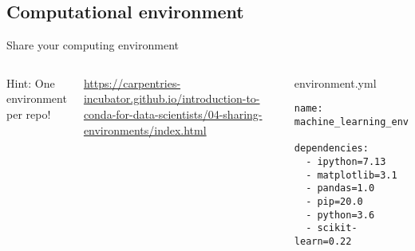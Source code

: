 \documentclass[10pt,aspectratio=169]{beamer} %
\begin{document}
\subsection{Computational environment}
\begin{frame}[fragile,label=frame29]{Share your computing environment}
\begin{columns}
Hint: One environment per repo!	\\
\vspace{5mm}

\url{https://carpentries-incubator.github.io/introduction-to-conda-for-data-scientists/04-sharing-environments/index.html}
\begin{block}{environment.yml}
\begin{verbatim}
name: machine_learning_env

dependencies:
  - ipython=7.13
  - matplotlib=3.1
  - pandas=1.0
  - pip=20.0
  - python=3.6
  - scikit-learn=0.22
\end{verbatim}
\end{block}
\end{columns}
\end{frame}
\end{document}
